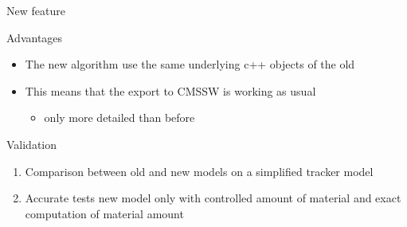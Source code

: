 \documentclass[pdftex, 11pt]{beamer}
\begin{document}
\begin{frame}{New feature}
\begin{center}
  \end{center}
\end{frame}

\begin{frame}{Advantages}
  \begin{itemize}
  \item The new algorithm use the \alert{same} underlying c++ objects of the old
    \pause
  \item This means that the \alert{export} to \alert{CMSSW} is working as usual
    \begin{itemize}
    \item only more \alert{detailed} than before
    \end{itemize}
  \end{itemize}
\end{frame}

\begin{frame}{Validation}
  \begin{enumerate}
  \item \alert{Comparison} between old and new models on a simplified
    tracker model
    \pause
  \item Accurate \alert{tests} new model only with controlled amount of material and exact computation of material amount
  \end{enumerate}
\end{frame}
\end{document}
